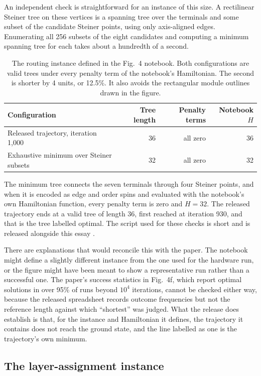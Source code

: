 \documentclass[11pt]{article}
\theoremstyle{definition}
\theoremstyle{remark}
\begin{document}
An independent check is straightforward for an instance of this size. A rectilinear Steiner tree on these vertices is a spanning tree over the terminals and some subset of the candidate Steiner points, using only axis-aligned edges. Enumerating all 256 subsets of the eight candidates and computing a minimum spanning tree for each takes about a hundredth of a second.

\begin{table}[h]
\centering
\small
\begin{tabular}{lrrr}
\toprule
Configuration & Tree length & Penalty terms & Notebook $H$ \\
\midrule
Released trajectory, iteration 1,000 & 36 & all zero & 36 \\
Exhaustive minimum over Steiner subsets & 32 & all zero & 32 \\
\bottomrule
\end{tabular}
\caption{The routing instance defined in the Fig.~4 notebook. Both configurations are valid trees under every penalty term of the notebook's Hamiltonian. The second is shorter by 4 units, or 12.5\%. It also avoids the rectangular module outlines drawn in the figure.}
\label{tab:route}
\end{table}

The minimum tree connects the seven terminals through four Steiner points, and when it is encoded as edge and order spins and evaluated with the notebook's own Hamiltonian function, every penalty term is zero and $H = 32$. The released trajectory ends at a valid tree of length 36, first reached at iteration 930, and that is the tree labelled optimal. The script used for these checks is short and is released alongside this essay \cite{flyxion-script}.

There are explanations that would reconcile this with the paper. The notebook might define a slightly different instance from the one used for the hardware run, or the figure might have been meant to show a representative run rather than a successful one. The paper's success statistics in Fig.~4f, which report optimal solutions in over 95\% of runs beyond $10^4$ iterations, cannot be checked either way, because the released spreadsheet records outcome frequencies but not the reference length against which ``shortest'' was judged. What the release does establish is that, for the instance and Hamiltonian it defines, the trajectory it contains does not reach the ground state, and the line labelled as one is the trajectory's own minimum.

\subsection*{The layer-assignment instance}
\end{document}
